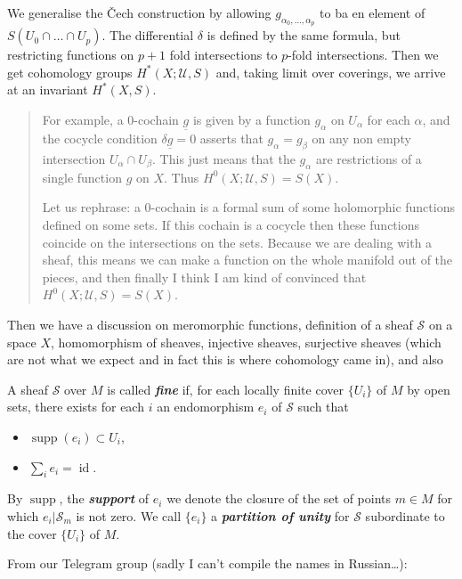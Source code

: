\documentclass{article}
\newcommand{\Sc}{\mathcal{S}}
\newcommand{\Uc}{\mathcal{U}}
\DeclareMathOperator{\id}{id}
\DeclareMathOperator{\supp}{supp}
\begin{document}
We generalise the \v Cech construction by allowing $g_{\alpha_0,\ldots,\alpha_p}$ to ba en element of $S(U_0\cap\ldots\cap U_p)$. The differential $\delta$ is defined by the same formula, but restricting functions on $p+1$ fold intersections to $p$-fold intersections.  Then we get cohomology groups $H^*(X;\Uc,S)$ and, taking limit over coverings, we arrive at an invariant $H^*(X,S)$.

\begin{quote}
	For example, a 0-cochain $\underline{g}$ is given by a function $g_\alpha$ on $U_\alpha$ for each $\alpha$, and the cocycle condition $\delta\underline{g}=0$ asserts that $g_\alpha=g_\beta$ on any non empty intersection $U_\alpha\cap U_\beta$. This just means that the $g_\alpha$ are restrictions of a single function $g$ on $X$. Thus $H^0(X;\Uc,S)=S(X)$.
	
	{\color{cyan}Let us rephrase: a 0-cochain is a formal sum of some holomorphic functions defined on some sets. If this cochain is a cocycle then these functions coincide on the intersections on the sets. Because we are dealing with a sheaf, this means we can make a function on the whole manifold out of the pieces,} {\color{magenta}and then finally I think I am kind of convinced that $H^0(X;\Uc,S)=S(X)$.}
\end{quote}
{\color{cyan}Then we have a discussion on meromorphic functions, definition of a sheaf $\Sc$ on a space $X$, homomorphism of sheaves, injective sheaves, surjective sheaves (which are not what we expect and in fact this is where cohomology came in), and also}
\begin{defn}
	A sheaf $\Sc$ over $M$ is called \textbf{\textit{fine}} if, for each locally finite cover $\{U_i\}$ of $M$ by open sets, there exists for each $i$ an endomorphism $e_i$ of $\Sc$ such that
	\begin{itemize}
		\item $\supp(e_i)\subset U_i$,
		\item $\sum_ie_i=\id$.
	\end{itemize}
	By $\supp$, the \textbf{\textit{support}} of $e_i$ we denote the closure of the set of points $m\in M$ for which $e_i|\Sc_m$ is not zero. We call $\{e_i\}$ a \textbf{\textit{partition of unity}} for $\Sc$ subordinate to the cover $\{U_i\}$ of $M$.
\end{defn}
From our Telegram group (sadly I can't compile the names in Russian…):
\end{document}
